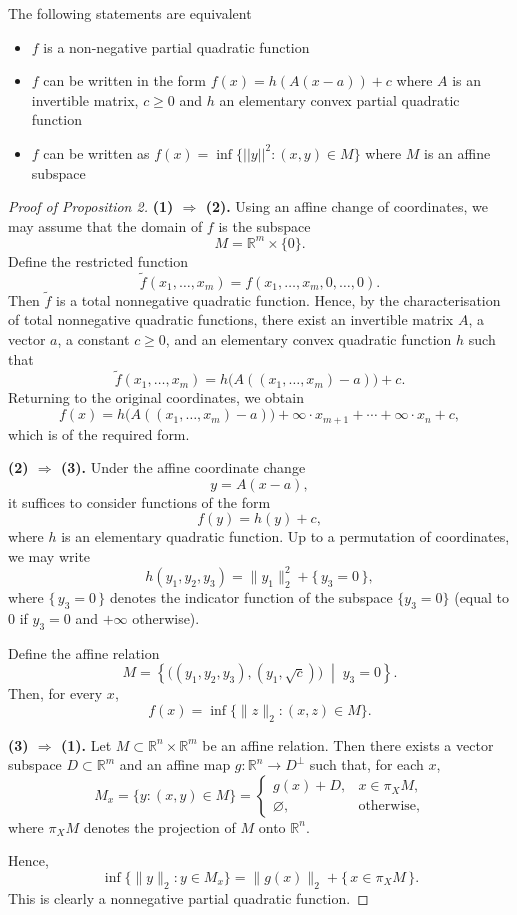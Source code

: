 \begin{proposition}\label{prop:PQFEquivalence}
    The following statements are equivalent
    \begin{itemize}
        \item $f$ is a non-negative partial quadratic function
        \item $f$ can be written in the form $f(x) = h(A(x-a)) + c$ where $A$ is an invertible matrix, $c \ge 0$ and $h$ an elementary convex partial quadratic function
        \item $f$ can be written as $f(x) = \inf \{ ||y||^2: (x,y) \in M\}$ where $M$ is an affine subspace
    \end{itemize}
\end{proposition}


\begin{proof}[Proof of Proposition 2]

\noindent
\textbf{(1) $\Rightarrow$ (2).}
Using an affine change of coordinates, we may assume that the domain of $f$
is the subspace
\[
M=\mathbb{R}^m \times \{0\}.
\]
Define the restricted function
\[
\tilde f(x_1,\dots,x_m)
=
f(x_1,\dots,x_m,0,\dots,0).
\]
Then $\tilde f$ is a total nonnegative quadratic function. Hence, by the
characterisation of total nonnegative quadratic functions,
there exist an invertible matrix $A$, a vector $a$, a constant $c\ge 0$,
and an elementary convex quadratic function $h$ such that
\[
\tilde f(x_1,\dots,x_m)
=
h\big(A((x_1,\dots,x_m)-a)\big)+c.
\]
Returning to the original coordinates, we obtain
\[
f(x)
=
h\big(A((x_1,\dots,x_m)-a)\big)
+ \infty \cdot x_{m+1}
+ \cdots
+ \infty \cdot x_n
+ c,
\]
which is of the required form.

\medskip
\noindent
\textbf{(2) $\Rightarrow$ (3).}
Under the affine coordinate change
\[
y = A(x-a),
\]
it suffices to consider functions of the form
\[
f(y)=h(y)+c,
\]
where $h$ is an elementary quadratic function. Up to a permutation of
coordinates, we may write
\[
h(y_1,y_2,y_3)
=
\|y_1\|_2^2
+
\{\, y_3=0 \,\},
\]
where $\{\, y_3=0 \,\}$ denotes the indicator function of the subspace
$\{y_3=0\}$ (equal to $0$ if $y_3=0$ and $+\infty$ otherwise).

Define the affine relation
\[
M
=
\left\{
\big((y_1,y_2,y_3),(y_1,\sqrt{c})\big)
\;\middle|\;
y_3=0
\right\}.
\]
Then, for every $x$,
\[
f(x)
=
\inf\{\|z\|_2 : (x,z)\in M\}.
\]

\medskip
\noindent
\textbf{(3) $\Rightarrow$ (1).}
Let $M\subset \mathbb{R}^n\times\mathbb{R}^m$ be an affine relation.
Then there exists a vector subspace $D\subset \mathbb{R}^m$ and an affine map
$g:\mathbb{R}^n\to D^\perp$ such that, for each $x$,
\[
M_x
=
\{y : (x,y)\in M\}
=
\begin{cases}
g(x)+D, & x\in \pi_X M,\\
\varnothing, & \text{otherwise},
\end{cases}
\]
where $\pi_X M$ denotes the projection of $M$ onto $\mathbb{R}^n$.

Hence,
\[
\inf\{\|y\|_2 : y\in M_x\}
=
\|g(x)\|_2
+
\{\, x\in \pi_X M \,\}.
\]
This is clearly a nonnegative partial quadratic function.
\end{proof}

